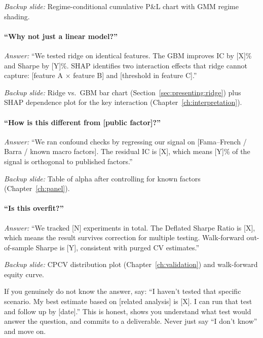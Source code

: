 \noindent\emph{Backup slide:} Regime-conditional cumulative P\&L chart
with GMM regime shading.

\paragraph{``Why not just a linear model?''}
\emph{Answer:} ``We tested ridge on identical features.  The GBM
improves IC by [X]\% and Sharpe by [Y]\%.  SHAP identifies two
interaction effects that ridge cannot capture: [feature A $\times$
feature B] and [threshold in feature C].''

\noindent\emph{Backup slide:} Ridge vs.\ GBM bar chart
(Section~\ref{sec:presenting:ridge}) plus SHAP dependence plot for the
key interaction (Chapter~\ref{ch:interpretation}).

\paragraph{``How is this different from [public factor]?''}
\emph{Answer:} ``We ran confound checks by regressing our signal on
[Fama--French / Barra / known macro factors].  The residual IC is
[X], which means [Y]\% of the signal is orthogonal to published
factors.''

\noindent\emph{Backup slide:} Table of alpha after controlling for known
factors (Chapter~\ref{ch:panel}).

\paragraph{``Is this overfit?''}
\emph{Answer:} ``We tracked [N] experiments in total.  The Deflated
Sharpe Ratio is [X], which means the result survives correction for
multiple testing.  Walk-forward out-of-sample Sharpe is [Y], consistent
with purged CV estimates.''

\noindent\emph{Backup slide:} CPCV distribution plot
(Chapter~\ref{ch:validation}) and walk-forward equity curve.

\begin{warning}
If you genuinely do not know the answer, say: ``I haven't tested that
specific scenario.  My best estimate based on [related analysis] is [X].
I can run that test and follow up by [date].''  This is honest, shows
you understand what test would answer the question, and commits to a
deliverable.  Never just say ``I don't know'' and move on.
\end{warning}


